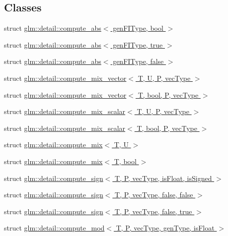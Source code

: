 \subsection*{Classes}
\begin{DoxyCompactItemize}
\item 
struct \hyperlink{structglm_1_1detail_1_1compute__abs}{glm\-::detail\-::compute\-\_\-abs$<$ gen\-F\-I\-Type, bool $>$}
\item 
struct \hyperlink{structglm_1_1detail_1_1compute__abs_3_01genFIType_00_01true_01_4}{glm\-::detail\-::compute\-\_\-abs$<$ gen\-F\-I\-Type, true $>$}
\item 
struct \hyperlink{structglm_1_1detail_1_1compute__abs_3_01genFIType_00_01false_01_4}{glm\-::detail\-::compute\-\_\-abs$<$ gen\-F\-I\-Type, false $>$}
\item 
struct \hyperlink{structglm_1_1detail_1_1compute__mix__vector}{glm\-::detail\-::compute\-\_\-mix\-\_\-vector$<$ T, U, P, vec\-Type $>$}
\item 
struct \hyperlink{structglm_1_1detail_1_1compute__mix__vector_3_01T_00_01bool_00_01P_00_01vecType_01_4}{glm\-::detail\-::compute\-\_\-mix\-\_\-vector$<$ T, bool, P, vec\-Type $>$}
\item 
struct \hyperlink{structglm_1_1detail_1_1compute__mix__scalar}{glm\-::detail\-::compute\-\_\-mix\-\_\-scalar$<$ T, U, P, vec\-Type $>$}
\item 
struct \hyperlink{structglm_1_1detail_1_1compute__mix__scalar_3_01T_00_01bool_00_01P_00_01vecType_01_4}{glm\-::detail\-::compute\-\_\-mix\-\_\-scalar$<$ T, bool, P, vec\-Type $>$}
\item 
struct \hyperlink{structglm_1_1detail_1_1compute__mix}{glm\-::detail\-::compute\-\_\-mix$<$ T, U $>$}
\item 
struct \hyperlink{structglm_1_1detail_1_1compute__mix_3_01T_00_01bool_01_4}{glm\-::detail\-::compute\-\_\-mix$<$ T, bool $>$}
\item 
struct \hyperlink{structglm_1_1detail_1_1compute__sign}{glm\-::detail\-::compute\-\_\-sign$<$ T, P, vec\-Type, is\-Float, is\-Signed $>$}
\item 
struct \hyperlink{structglm_1_1detail_1_1compute__sign_3_01T_00_01P_00_01vecType_00_01false_00_01false_01_4}{glm\-::detail\-::compute\-\_\-sign$<$ T, P, vec\-Type, false, false $>$}
\item 
struct \hyperlink{structglm_1_1detail_1_1compute__sign_3_01T_00_01P_00_01vecType_00_01false_00_01true_01_4}{glm\-::detail\-::compute\-\_\-sign$<$ T, P, vec\-Type, false, true $>$}
\item 
struct \hyperlink{structglm_1_1detail_1_1compute__mod}{glm\-::detail\-::compute\-\_\-mod$<$ T, P, vec\-Type, gen\-Type, is\-Float $>$}
\end{DoxyCompactItemize}

